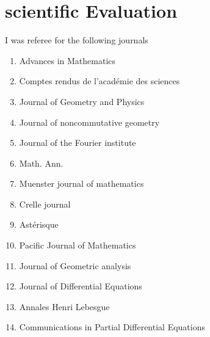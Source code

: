\documentclass[A4,11pt]{article}
\begin{document}
  \section{scientific Evaluation}
  I was referee for the following journals \begin{enumerate}
  \item Advances in Mathematics
  \item Comptes rendus de l'académie des sciences
  \item Journal of Geometry and Physics
  \item Journal of noncommutative geometry
  \item   Journal of the Fourier institute
  \item Math. Ann.  
  \item Muenster journal of mathematics
    \item Crelle journal
    \item Astérisque
    \item Pacific Journal of Mathematics
    \item Journal of Geometric analysis
    \item Journal of Differential Equations
    \item Annales Henri Lebesgue
    \item Communications in Partial Differential Equations
  \end{enumerate}
\iffalse
\end{document}
